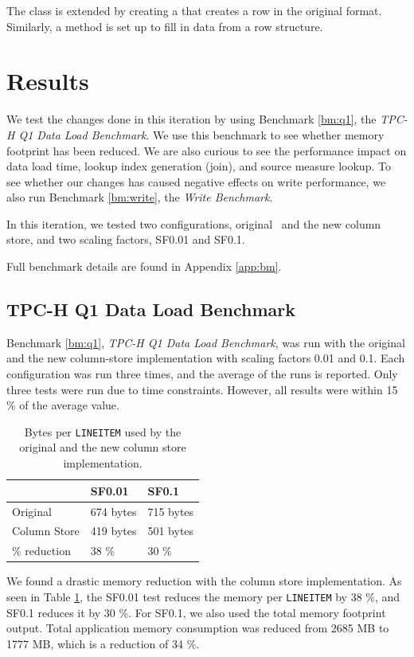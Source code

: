 The class is extended by creating a  that creates a row in the original format. Similarly, a method  is set up to fill in data from a row structure.

\section{Results}
\label{sec:Results}
We test the changes done in this iteration by using Benchmark \ref{bm:q1}, the \textit{TPC-H Q1 Data Load Benchmark}. We use this benchmark to see whether memory footprint has been reduced. We are also curious to see the performance impact on data load time, lookup index generation (join), and source measure lookup. To see whether our changes has caused negative effects on write performance, we also run Benchmark \ref{bm:write}, the \textit{Write Benchmark}. 

In this iteration, we tested two configurations, original \gap~and the new column store, and two scaling factors, SF0.01 and SF0.1.

Full benchmark details are found in Appendix \ref{app:bm}.

\subsection{TPC-H Q1 Data Load Benchmark}
\label{column-store:q1}
Benchmark \ref{bm:q1}, \textit{TPC-H Q1 Data Load Benchmark}, was run with the original and the new column-store implementation with scaling factors 0.01 and 0.1. Each configuration was run three times, and the average of the runs is reported. Only three tests were run due to time constraints. However, all results were within 15 \% of the average value.

\begin{table}
    \centering
    \begin{tabularx}{0.75\textwidth}{X | X X}
        & SF0.01 & SF0.1 \\ 
        \hline
        \hline
        Original & 674 bytes & 715 bytes \\
        Column Store & 419 bytes & 501 bytes \\
        \% reduction & 38 \% & 30 \% \\
    \end{tabularx}
    \caption{Bytes per \texttt{LINEITEM} used by the original and the new column store implementation.} 
    \label{tab:non-blackbox-bpl}
\end{table}
We found a drastic memory reduction with the column store implementation. As seen in Table \ref{tab:non-blackbox-bpl}, the SF0.01 test reduces the memory per \texttt{LINEITEM} by 38 \%, and SF0.1 reduces it by 30 \%. For SF0.1, we also used the total memory footprint output. Total application memory consumption was reduced from 2685 MB to 1777 MB, which is a reduction of 34 \%.

